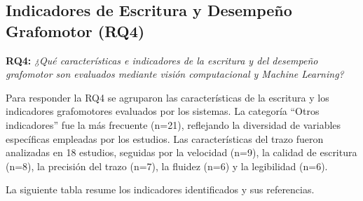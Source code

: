 \documentclass{iaesarticle}
\begin{document}
\FloatBarrier


\subsection{Indicadores de Escritura y Desempeño Grafomotor (RQ4)}
\label{subsec:rq4}

\textbf{RQ4:} \textit{¿Qué características e indicadores de la escritura y del desempeño grafomotor son evaluados mediante visión computacional y Machine Learning?}

Para responder la RQ4 se agruparon las características de la escritura y los indicadores grafomotores evaluados por los sistemas. La categoría ``Otros indicadores'' fue la más frecuente (n=21), reflejando la diversidad de variables específicas empleadas por los estudios. Las características del trazo fueron analizadas en 18 estudios, seguidas por la velocidad (n=9), la calidad de escritura (n=8), la precisión del trazo (n=7), la fluidez (n=6) y la legibilidad (n=6).

La siguiente tabla resume los indicadores identificados y sus referencias.
\end{document}
